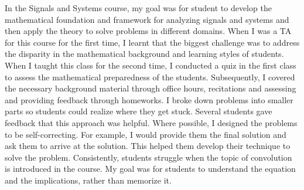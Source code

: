 \documentclass[10pt]{article}
\begin{document}

In the Signals and Systems course, my goal was for student to develop the mathematical foundation and framework for analyzing signals and systems and then apply the theory to solve problems in different domains. 
When I was a TA for this course for the first time, I learnt that the biggest challenge was to address the disparity in the mathematical background and learning styles of students. When I taught this class for the second time, I conducted a quiz in the first class to assess the mathematical preparedness of the students. Subsequently, I covered the necessary background material through office hours, recitations and assessing and providing feedback through homeworks. I broke down problems into smaller parts so students could realize where they get stuck. Several students gave feedback that this approach was helpful. Where possible, I designed the problems to be self-correcting. For example, I would provide them the final solution and ask them to arrive at the solution. This helped them develop their technique to solve the problem. %
Consistently, students struggle when the topic of convolution is introduced in the course. %
My goal was for students to understand the equation and the implications, rather than memorize it. 
\end{document}
